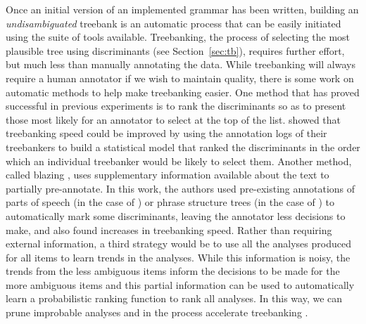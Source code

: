 \documentclass[12pt]{article}
\begin{document}
Once an initial version of an implemented grammar has been written, building an
\textit{undisambiguated} treebank is an automatic process that can be easily
initiated using the suite of tools available. Treebanking, the process of
selecting the most plausible tree using discriminants (see
Section~\ref{sec:tb}), requires further effort, but much less than manually
annotating the data. 
While treebanking will always require a human annotator if we wish to
maintain quality, there is some work on automatic methods to help make
treebanking easier.  One method that has proved successful in previous
experiments is to rank the discriminants so as to present those most
likely for an annotator to select at the top of the
list.  showed that treebanking speed could be
improved by using the annotation logs of their treebankers to build a
statistical model that ranked the discriminants in the order which an
individual treebanker would be likely to select them. Another method,
called blazing \cite{Tan:Bon:Oep:Fuj:05,MacKinlay+:2011b}, uses
supplementary information available about the text to partially
pre-annotate. In this work, the authors used pre-existing annotations of
parts of speech (in the case of ) or phrase
structure trees (in the case of ) to
automatically mark some discriminants, leaving the annotator less
decisions to make, and also found increases in treebanking speed.  Rather
than requiring external information, a third strategy would be to use
all the analyses produced for all items to learn trends in the
analyses. While this information is noisy, the trends from the less
ambiguous items inform the decisions to be made for the more ambiguous
items and this partial information can be used to automatically learn a
probabilistic ranking function to rank all analyses. In this way, we can
prune improbable analyses and in the process accelerate treebanking
\cite{Dridan:Baldwin:2010}.

\end{document}
